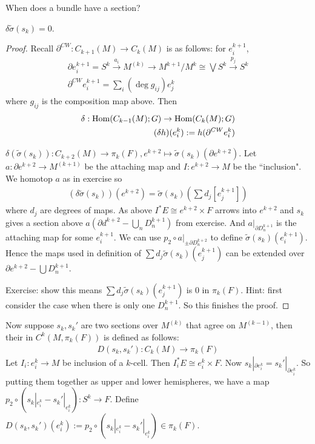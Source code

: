 \documentclass[12pt,class=article,crop=false]{standalone}
\begin{document}
When does a bundle have a section?

\begin{lem}
$ \delta \widetilde{ \sigma}(s_k) = 0$.
\end{lem}
\begin{proof}
Recall $ \partial ^{CW}: C_{k+1}(M) \to C_k(M)$ is as follows: for $ e_i^{k+1}$,
\begin{align*}
	\partial e_i^{k+1} = S^{k} \xrightarrow{ a_i} M^{(k)}  \to M^{k+1} / M^{k} \cong \bigvee S^{k} \xrightarrow{ p_j} S^{k} \\
	\partial ^{CW} e_i^{k+1} = \sum_i (\deg g_{ij}) e_j^{k}
\end{align*}
where $ g_{ij}$ is the composition map above. Then
\begin{align*}
	\delta: \operatorname{Hom}( C_{k-1}( M);G) \to \operatorname{Hom}( C_k(M);G )\\
	(\delta h)(e_i^{k}) := h ( \partial ^{CW} e_i^{k})
\end{align*}

$ \delta( \widetilde{ \sigma}(s_k)): C_{k+2}(M) \to \pi_k(F), e^{k+2} \mapsto \widetilde{ \sigma}(s_k)( \partial e^{k+2})$. Let $ a: \partial e^{k+2} \to M^{(k+1)}$ be the attaching map and $ I:e^{k+2} \to M$ be the ``inclusion". We homotop $ a$ as in exercise so
 \begin{align*}
	 (\delta \widetilde{ \sigma}(s_k))(e^{k+2}) = \widetilde{ \sigma}(s_k)( \sum d_j [e_j^{k+1}])
\end{align*}
where $ d_j$ are degrees of maps. As above $ I^* E \cong e^{k+2} \times F$ arrows into $ e^{k+2}$ and $ s_k$ gives a section above $ a(\partial d^{k+2} - \bigcup_{ n}D_n^{k+1})$ from exercise. And $ a|_{ \partial D_n^{k+1}}$ is the attaching map for some $e_i^{k+1} $. We can use $ p_2 \circ a|_{ \pm \partial D_n^{k+2}}$ to define $ \widetilde{ \sigma}(s_k) (e_i^{k+1})$. Hence the maps used in definition of $ \sum d_j \widetilde{ \sigma}(s_k)(e_j^{k+1})$ can be extended over $ \partial e^{k+2} - \bigcup D_n^{k+1} $.

Exercise: show this means $ \sum d_j \widetilde{ \sigma}(s_k)(e_j^{k+1})$ is 0 in $ \pi_k(F)$. Hint: first consider the case when there is only one $ D_n^{k+1}$. So this finishes the proof.
\end{proof}

Now suppose $ s_k,s_k'$ are two sections over $ M^{(k)}$ that agree on $ M^{(k-1)}$, then their  in $ C^{k}(M, \pi_k(F))$ is defined as follows:
\begin{align*}
	D(s_k,s_k'): C_k(M) \to \pi_k(F)
\end{align*}
Let $ I_i: e_i^{k} \to M$ be inclusion of a $ k$-cell. Then  $ I_i^* E \cong e_i^{k} \times F$. Now $ s_k|_{\partial e_i^{k}} = s_k'|_{\partial e_i^{k}}$. So putting them together as upper and lower hemispheres, we have a map $ p_2 \circ (s_k|_{e_i^{k}} - s_k'|_{e_i^{k}}): S^{k} \to F$. Define $ D(s_k,s_k')(e_i^{k}):= p_2 \circ (s_k|_{e_i^{k}} - s_k'|_{e_i^{k}}) \in \pi_k(F)$.
\end{document}
